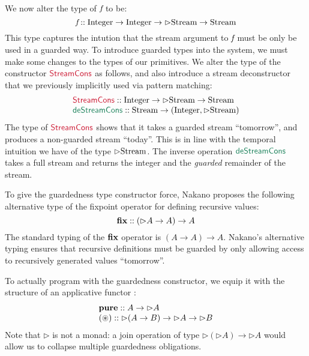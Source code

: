 We now alter the type of $\textit{f}$ to be:
\begin{displaymath}
  \textit{f} :: \textrm{Integer} \to \textrm{Integer} \to \rhd\textrm{Stream} \to \textrm{Stream}
\end{displaymath}
This type captures the intution that the stream argument to
$\textit{f}$ must be only be used in a guarded way. To introduce
guarded types into the system, we must make some changes to the types
of our primitives. We alter the type of the constructor
$\cons{StreamCons}$ as follows, and also introduce a stream
deconstructor that we previously implicitly used via pattern matching:
\begin{displaymath}
  \begin{array}{l}
    \cons{StreamCons} :: \tyname{Integer} \to \rhd\tyname{Stream} \to \tyname{Stream} \\
    \elim{deStreamCons} :: \tyname{Stream} \to (\tyname{Integer}, \rhd\tyname{Stream})
  \end{array}
\end{displaymath}
The type of $\cons{StreamCons}$ shows that it takes a guarded stream
``tomorrow'', and produces a non-guarded stream ``today''. This is in
line with the temporal intuition we have of the type
$\rhd\textrm{Stream}$. The inverse operation $\elim{deStreamCons}$
takes a full stream and returns the integer and the \emph{guarded}
remainder of the stream.

To give the guardedness type constructor force, Nakano proposes the
following alternative type of the fixpoint operator for defining
recursive values:
\begin{displaymath}
  \textbf{fix} :: (\rhd A \to A) \to A
\end{displaymath}
The standard typing of the $\textbf{fix}$ operator is $(A \to A) \to
A$. Nakano's alternative typing ensures that recursive definitions
must be guarded by only allowing access to recursively generated
values ``tomorrow''.

To actually program with the guardedness constructor, we equip it with
the structure of an applicative functor \cite{mcbride08applicative}:
\begin{displaymath}
  \begin{array}{l}
    \textbf{pure} :: A \to \rhd A \\
    \textbf{$(\circledast)$} :: \rhd (A \to B) \to \rhd A \to \rhd B
  \end{array}
\end{displaymath}
Note that $\rhd$ is not a monad: a join operation of type $\rhd(\rhd
A) \to \rhd A$ would allow us to collapse multiple guardedness
obligations.

